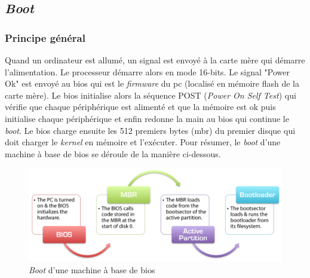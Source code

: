 \documentclass[a4paper, 12pt]{article}
\begin{document}

\subsection{\textit{Boot}}
\subsubsection{Principe général}
Quand un ordinateur est allumé, un signal est envoyé à la carte mère qui démarre
l'alimentation. Le processeur démarre alors en mode 16-bits. Le signal "Power Ok"
est envoyé au \acrshort{bios} qui est le \textit{firmware} du \acrshort{pc}
(localisé en mémoire flash de la carte mère). Le \acrshort{bios} initialise alors
la séquence POST (\textit{Power On Self Test}) qui vérifie que chaque périphérique
est alimenté et que la mémoire est ok puis initialise chaque périphérique et enfin
redonne la main au \acrshort{bios} qui continue le \textit{boot}. Le \acrshort{bios}
charge ensuite les 512 premiers bytes (\acrshort{mbr}) du premier disque qui doit
charger le \textit{kernel} en mémoire et l'exécuter. Pour résumer, le \textit{boot}
d'une machine à base de \acrshort{bios} se déroule de la manière ci-dessous.\cite{ref42}

\begin{figure}[!h]
  \centering
  \includegraphics[scale=0.4]{images/bios_boot.png}
  \caption{\textit{Boot} d'une machine à base de \acrshort{bios}}
\end{figure}
\end{document}
